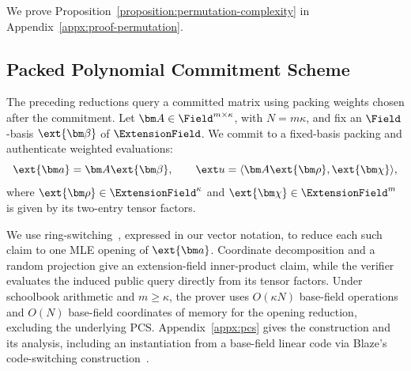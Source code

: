 We prove Proposition~\ref{proposition:permutation-complexity} in
Appendix~\ref{appx:proof-permutation}.

\subsection{Packed Polynomial Commitment Scheme}
\label{sec:pcs}

The preceding reductions query a committed matrix using packing
weights chosen after the commitment.
Let \(\bm A\in\Field^{m\times\kappa}\), with \(N=m\kappa\),
and fix an \(\Field\)-basis \(\ext{\bm\beta}\) of
\(\ExtensionField\).
We commit to a fixed-basis packing and authenticate weighted
evaluations:
\[
    \ext{\bm a}=\bm A\ext{\bm\beta},
    \qquad
    \ext u=\langle\bm A\ext{\bm\rho},\ext{\bm\chi}\rangle,
\]
where \(\ext{\bm\rho}\in\ExtensionField^\kappa\) and
\(\ext{\bm\chi}\in\ExtensionField^m\) is given by its two-entry
tensor factors.

We use ring-switching~\cite{eurocrypt/DiamondP26}, expressed in
our vector notation, to reduce each such claim to one MLE opening
of \(\ext{\bm a}\).
Coordinate decomposition and a random projection give an
extension-field inner-product claim, while the verifier evaluates
the induced public query directly from its tensor factors.
Under schoolbook arithmetic and \(m\geq\kappa\), the prover uses
\(O(\kappa N)\) base-field operations and \(O(N)\) base-field
coordinates of memory for the opening reduction, excluding the
underlying PCS.
Appendix~\ref{appx:pcs} gives the construction and its analysis,
including an instantiation from a base-field linear code via
Blaze's code-switching construction~\cite{eurocrypt/BrehmCFRRZ25}.
